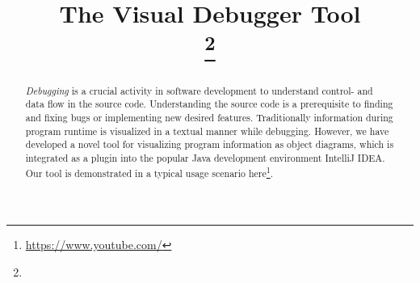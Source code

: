 \documentclass[conference]{IEEEtran}
\newcommand{\intellij}{IntelliJ IDEA}
\begin{document}
\title{The Visual Debugger Tool\\
{}
\thanks{}
}

\author{
}

\maketitle


\begin{abstract}
\emph{Debugging} is a crucial activity in software development to understand control- and data flow in the source code.
Understanding the source code is a prerequisite to finding and fixing bugs or implementing new desired features. 
Traditionally information during program runtime is visualized in a textual manner while debugging.
However, we have developed a novel tool for visualizing program information as object diagrams, which is integrated as a plugin into the popular Java development environment \intellij{}.
Our tool is demonstrated in a typical usage scenario here\footnote{\url{https://www.youtube.com/}}.
\end{abstract}
\end{document}
